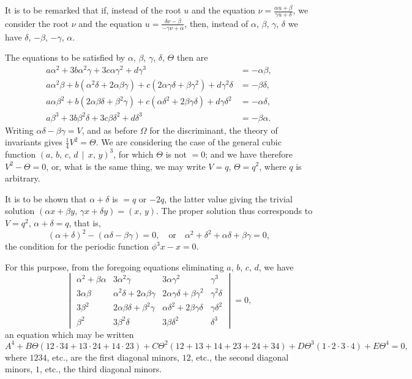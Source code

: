 \documentclass[11pt,a4paper]{article}
\theoremstyle{cayley}
\begin{document}
It is to be remarked that if, instead of the root $u$ and the equation $\nu = \frac{\alpha u + \beta}{\gamma u + \delta}$, we consider the root $\nu$ and the equation $u = \frac{\delta\nu - \beta}{-\gamma\nu + \alpha}$, then, instead of $\alpha$, $\beta$, $\gamma$, $\delta$ we have $\delta$, $-\beta$, $-\gamma$, $\alpha$.

The equations to be satisfied by $\alpha$, $\beta$, $\gamma$, $\delta$, $\Theta$ then are
\begin{align*}
a\alpha^{2} + 3b\alpha^{2}\gamma + 3c\alpha\gamma^{2} + d\gamma^{3} &= -\alpha\beta,\\
a\alpha^{2}\beta + b(\alpha^{2}\delta + 2\alpha\beta\gamma) + c(2\alpha\gamma\delta + \beta\gamma^{2}) + d\gamma^{2}\delta &= -\beta\delta,\\
a\alpha\beta^{2} + b(2\alpha\beta\delta + \beta^{2}\gamma) + c(\alpha\delta^{2} + 2\beta\gamma\delta) + d\gamma\delta^{2} &= -\alpha\delta,\\
a\beta^{3} + 3b\beta^{2}\delta + 3c\beta\delta^{2} + d\delta^{3} &= -\beta\alpha.
\end{align*}
Writing $\alpha\delta - \beta\gamma = V$, and as before $\Omega$ for the discriminant, the theory of invariants gives $\frac{1}{4}V^{2} = \Theta$. We are considering the case of the general cubic function $(a,\, b,\, c,\, d \,\!\!\mid\!\!\, x,\, y)^{3}$, for which $\Theta$ is not $=0$; and we have therefore $V^{2} - \Theta = 0$, or, what is the same thing, we may write $V = q$, $\Theta = q^{2}$, where $q$ is arbitrary.

It is to be shown that $\alpha + \delta$ is $=q$ or $-2q$, the latter value giving the trivial solution $(\alpha x + \beta y,\, \gamma x + \delta y) = (x,\, y)$. The proper solution thus corresponds to $V = q^{2}$, $\alpha + \delta = q$, that is,
\[
(\alpha + \delta)^{2} - (\alpha\delta - \beta\gamma) = 0,\quad \text{or}\quad \alpha^{2} + \delta^{2} + \alpha\delta + \beta\gamma = 0,
\]
the condition for the periodic function $\phi^{3}x - x = 0$.

For this purpose, from the foregoing equations eliminating $a$, $b$, $c$, $d$, we have
\[
\begin{vmatrix}
\alpha^{2} + \beta\alpha & 3\alpha^{2}\gamma & 3\alpha\gamma^{2} & \gamma^{3} \\
3\alpha\beta & \alpha^{2}\delta + 2\alpha\beta\gamma & 2\alpha\gamma\delta + \beta\gamma^{2} & \gamma^{2}\delta \\
3\beta^{2} & 2\alpha\beta\delta + \beta^{2}\gamma & \alpha\delta^{2} + 2\beta\gamma\delta & \gamma\delta^{2} \\
\beta^{2} & 3\beta^{2}\delta & 3\beta\delta^{2} & \delta^{3}
\end{vmatrix} = 0,
\]
an equation which may be written
\[
A^{4} + B\Theta(12\cdot 34 + 13\cdot 24 + 14\cdot 23) + C\Theta^{2}(12 + 13 + 14 + 23 + 24 + 34) + D\Theta^{3}(1\cdot 2\cdot 3\cdot 4) + E\Theta^{4} = 0,
\]
where $1234$, etc., are the first diagonal minors, $12$, etc., the second diagonal minors, $1$, etc., the third diagonal minors.
\end{document}
